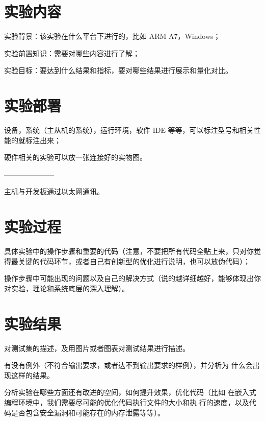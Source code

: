 \section{实验内容}

实验背景：该实验在什么平台下进行的，比如 ARM A7，Windows；

实验前置知识：需要对哪些内容进行了解；

实验目标：要达到什么结果和指标，要对哪些结果进行展示和量化对比。

\section{实验部署}

设备，系统（主从机的系统），运行环境，软件 IDE 等等，可以标注型号和相关性能的就标注出来；

硬件相关的实验可以放一张连接好的实物图。


---------------------

主机与开发板通过以太网通讯。


\section{实验过程}

具体实验中的操作步骤和重要的代码（注意，不要把所有代码全贴上来，只对你觉得最关键的代码环节，或者自己有创新型的优化进行说明，也可以放伪代码）；

操作步骤中可能出现的问题以及自己的解决方式（说的越详细越好，能够体现出你对实验，理论和系统底层的深入理解）。


\section{实验结果}

对测试集的描述，及用图片或者图表对测试结果进行描述。

有没有例外（不符合输出要求，或者达不到输出要求的样例），并分析为
什么会出现这样的结果。

分析实验在哪些方面还有改进的空间，如何提升效果，优化代码（比如
在嵌入式编程环境中，我们需要尽可能的优化代码执行文件的大小和执
行的速度，以及代码是否包含安全漏洞和可能存在的内存泄露等等）。


